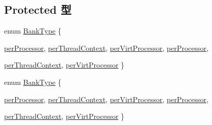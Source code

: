 \subsection*{Protected 型}
\begin{DoxyCompactItemize}
\item 
enum \hyperlink{classMipsISA_1_1ISA_a6fe085db0aa80588322c415f46d74bf1}{BankType} \{ \par
\hyperlink{classMipsISA_1_1ISA_a6fe085db0aa80588322c415f46d74bf1a9e47a436a373eae42c60d4ee29bfc1f4}{perProcessor}, 
\hyperlink{classMipsISA_1_1ISA_a6fe085db0aa80588322c415f46d74bf1a53b7a9b2f7a84180a64f7f1af3c1e318}{perThreadContext}, 
\hyperlink{classMipsISA_1_1ISA_a6fe085db0aa80588322c415f46d74bf1aa3cd85a7a7f1d2d497361aa806bfa87d}{perVirtProcessor}, 
\hyperlink{classMipsISA_1_1ISA_a6fe085db0aa80588322c415f46d74bf1a9e47a436a373eae42c60d4ee29bfc1f4}{perProcessor}, 
\par
\hyperlink{classMipsISA_1_1ISA_a6fe085db0aa80588322c415f46d74bf1a53b7a9b2f7a84180a64f7f1af3c1e318}{perThreadContext}, 
\hyperlink{classMipsISA_1_1ISA_a6fe085db0aa80588322c415f46d74bf1aa3cd85a7a7f1d2d497361aa806bfa87d}{perVirtProcessor}
 \}
\item 
enum \hyperlink{classMipsISA_1_1ISA_a6fe085db0aa80588322c415f46d74bf1}{BankType} \{ \par
\hyperlink{classMipsISA_1_1ISA_a6fe085db0aa80588322c415f46d74bf1a9e47a436a373eae42c60d4ee29bfc1f4}{perProcessor}, 
\hyperlink{classMipsISA_1_1ISA_a6fe085db0aa80588322c415f46d74bf1a53b7a9b2f7a84180a64f7f1af3c1e318}{perThreadContext}, 
\hyperlink{classMipsISA_1_1ISA_a6fe085db0aa80588322c415f46d74bf1aa3cd85a7a7f1d2d497361aa806bfa87d}{perVirtProcessor}, 
\hyperlink{classMipsISA_1_1ISA_a6fe085db0aa80588322c415f46d74bf1a9e47a436a373eae42c60d4ee29bfc1f4}{perProcessor}, 
\par
\hyperlink{classMipsISA_1_1ISA_a6fe085db0aa80588322c415f46d74bf1a53b7a9b2f7a84180a64f7f1af3c1e318}{perThreadContext}, 
\hyperlink{classMipsISA_1_1ISA_a6fe085db0aa80588322c415f46d74bf1aa3cd85a7a7f1d2d497361aa806bfa87d}{perVirtProcessor}
 \}
\end{DoxyCompactItemize}
